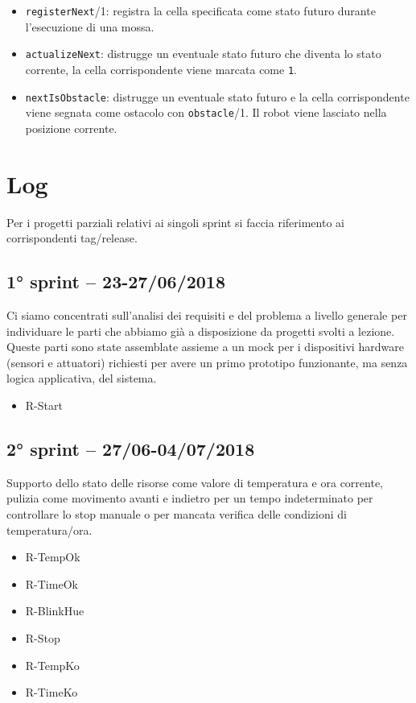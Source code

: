 \begin{itemize}
	\item \texttt{registerNext}/1: registra la cella specificata come stato futuro durante l'esecuzione di una mossa.
	\item \texttt{actualizeNext}: distrugge un eventuale stato futuro che diventa lo stato corrente, la cella corrispondente viene marcata come \texttt{1}.
	\item \texttt{nextIsObstacle}: distrugge un eventuale stato futuro e la cella corrispondente viene segnata come ostacolo con \texttt{obstacle}/1. Il robot viene lasciato nella posizione corrente.
\end{itemize}

\section{Log}

Per i progetti parziali relativi ai singoli sprint si faccia riferimento ai corrispondenti tag/release.

\subsection{1° sprint -- 23-27/06/2018}
Ci siamo concentrati sull'analisi dei requisiti e del problema a livello generale per individuare le parti che abbiamo già a disposizione da progetti svolti a lezione. Queste parti sono state assemblate assieme a un mock per i dispositivi hardware (sensori e attuatori) richiesti per avere un primo prototipo funzionante, ma senza logica applicativa, del sistema.

\begin{itemize}
	\ttfamily
	\item R-Start
\end{itemize}

\subsection{2° sprint -- 27/06-04/07/2018}
Supporto dello stato delle risorse come valore di temperatura e ora corrente, pulizia come movimento avanti e indietro per un tempo indeterminato per controllare lo stop manuale o per mancata verifica delle condizioni di temperatura/ora.

\begin{itemize}
	\ttfamily
	\item R-TempOk
	\item R-TimeOk
	\item R-BlinkHue
	\item R-Stop
	\item R-TempKo
	\item R-TimeKo
\end{itemize}

